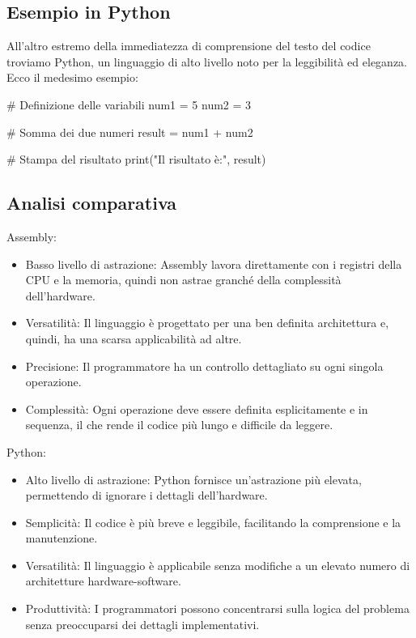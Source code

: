 \documentclass[
  letterpaper,
]{scrbook}
\newenvironment{Shaded}{\begin{snugshade}}{\end{snugshade}}
\newcommand{\BuiltInTok}[1]{\textcolor[rgb]{0.00,0.23,0.31}{#1}}
\newcommand{\CommentTok}[1]{\textcolor[rgb]{0.37,0.37,0.37}{#1}}
\newcommand{\DecValTok}[1]{\textcolor[rgb]{0.68,0.00,0.00}{#1}}
\newcommand{\NormalTok}[1]{\textcolor[rgb]{0.00,0.23,0.31}{#1}}
\newcommand{\OperatorTok}[1]{\textcolor[rgb]{0.37,0.37,0.37}{#1}}
\newcommand{\StringTok}[1]{\textcolor[rgb]{0.13,0.47,0.30}{#1}}
\providecommand{\tightlist}{%
  \setlength{\itemsep}{0pt}\setlength{\parskip}{0pt}}\usepackage{longtable,booktabs,array}
\begin{document}
\subsection{Esempio in Python}\label{esempio-in-python}

All'altro estremo della immediatezza di comprensione del testo del
codice troviamo Python, un linguaggio di alto livello noto per la
leggibilità ed eleganza. Ecco il medesimo esempio:

\begin{Shaded}
\begin{Highlighting}[]
\CommentTok{\# Definizione delle variabili}
\NormalTok{num1 }\OperatorTok{=} \DecValTok{5}
\NormalTok{num2 }\OperatorTok{=} \DecValTok{3}

\CommentTok{\# Somma dei due numeri}
\NormalTok{result }\OperatorTok{=}\NormalTok{ num1 }\OperatorTok{+}\NormalTok{ num2}

\CommentTok{\# Stampa del risultato}
\BuiltInTok{print}\NormalTok{(}\StringTok{"Il risultato è:"}\NormalTok{, result)}
\end{Highlighting}
\end{Shaded}

\subsection{Analisi comparativa}\label{analisi-comparativa}

Assembly:

\begin{itemize}
\tightlist
\item
  Basso livello di astrazione: Assembly lavora direttamente con i
  registri della CPU e la memoria, quindi non astrae granché della
  complessità dell'hardware.
\item
  Versatilità: Il linguaggio è progettato per una ben definita
  architettura e, quindi, ha una scarsa applicabilità ad altre.
\item
  Precisione: Il programmatore ha un controllo dettagliato su ogni
  singola operazione.
\item
  Complessità: Ogni operazione deve essere definita esplicitamente e in
  sequenza, il che rende il codice più lungo e difficile da leggere.
\end{itemize}

Python:

\begin{itemize}
\tightlist
\item
  Alto livello di astrazione: Python fornisce un'astrazione più elevata,
  permettendo di ignorare i dettagli dell'hardware.
\item
  Semplicità: Il codice è più breve e leggibile, facilitando la
  comprensione e la manutenzione.
\item
  Versatilità: Il linguaggio è applicabile senza modifiche a un elevato
  numero di architetture hardware-software.
\item
  Produttività: I programmatori possono concentrarsi sulla logica del
  problema senza preoccuparsi dei dettagli implementativi.
\end{itemize}
\end{document}
